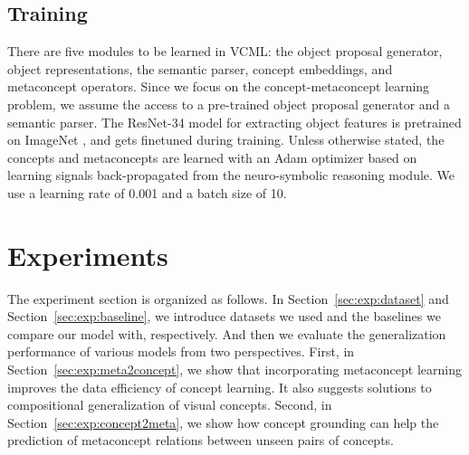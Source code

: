 \documentclass{article}
\newcommand{\sect}[1]{Section~\ref{#1}}
\newcommand{\model}{VCML\xspace}
\newcommand{\myparagraph}[1]{\vspace{-10pt}\paragraph{#1}}
\begin{document}
\subsection{Training}
There are five modules to be learned in \model: the object proposal generator, object representations, the semantic parser, concept embeddings, and metaconcept operators. Since we focus on the concept-metaconcept learning problem, we assume the access to a pre-trained object proposal generator and a semantic parser. The ResNet-34 model for extracting object features is pretrained on ImageNet \citep{Deng2009Imagenet}, and gets finetuned during training. Unless otherwise stated, the concepts and metaconcepts are learned with an Adam optimizer \citep{Kingma2015Adam} based on learning signals back-propagated from the neuro-symbolic reasoning module. We use a learning rate of 0.001 and a batch size of 10.



\newcommand{\mysubsection}[1]{\vspace{-0.3em}\subsection{#1}\vspace{-0.3em}}
\newcommand{\mysubsubsection}[1]{\vspace{-0.3em}\subsubsection{#1}\vspace{-0.3em}}
\renewcommand{\myparagraph}[1]{\vspace{-5pt}\paragraph{#1}}

\section{Experiments}


The experiment section is organized as follows. In \sect{sec:exp:dataset} and \sect{sec:exp:baseline}, we introduce datasets we used and the baselines we compare our model with, respectively. And then we evaluate the generalization performance of various models from two perspectives. First, in \sect{sec:exp:meta2concept}, we show that incorporating metaconcept learning improves the data efficiency of concept learning. It also suggests solutions to compositional generalization of visual concepts. Second, in \sect{sec:exp:concept2meta}, we show how concept grounding can help the prediction of metaconcept relations between unseen pairs of concepts.
\end{document}
